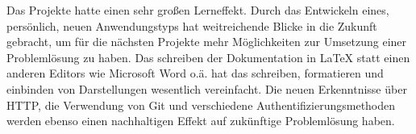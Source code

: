 Das Projekte hatte einen sehr großen Lerneffekt.
Durch das Entwickeln eines, persönlich, neuen Anwendungstyps hat weitreichende Blicke in die Zukunft gebracht, um für die nächsten Projekte mehr Möglichkeiten zur Umsetzung einer Problemlösung zu haben.
Das schreiben der Dokumentation in LaTeX statt einen anderen Editors wie Microsoft Word o.ä. hat das schreiben, formatieren und einbinden von Darstellungen wesentlich vereinfacht.
Die neuen Erkenntnisse über HTTP, die Verwendung von Git und verschiedene Authentifizierungsmethoden werden ebenso einen nachhaltigen Effekt auf zukünftige Problemlösung haben.